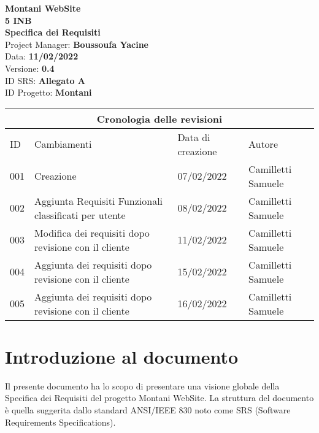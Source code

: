 \documentclass{article}
\begin{document}
	
	
	\begin{titlepage}
		\begin{center}
			\huge\textbf{Montani WebSite}\\
			\Large\textbf{5 INB}\\
			\Large \textbf{Specifica dei Requisiti}\\
			\vspace{4cm}
			\large Project Manager: \textbf{Boussoufa Yacine}\\
			\large Data: \textbf{11/02/2022}\\
			\large Versione: \textbf{0.4}\\
			\large ID SRS: \textbf{Allegato A}\\
			\large ID Progetto: \textbf{Montani}\\
			
		\end{center}
	\end{titlepage}
	
	\clearpage
	
	\begin{tabular}{ |p{1cm}|p{4cm}|p{3cm}|p{2cm}|  }
		\hline
		\multicolumn{4}{|c|}{Cronologia delle revisioni} \\
		\hline
		ID& Cambiamenti &Data di creazione&Autore\\
		\hline
		001   & Creazione    &07/02/2022&   Camilletti Samuele\\
		\hline
		002   & Aggiunta Requisiti Funzionali classificati per utente    &08/02/2022&   Camilletti Samuele\\
		\hline
		003   & Modifica dei requisiti dopo revisione con il cliente    &11/02/2022&   Camilletti Samuele\\
		\hline
		004   & Aggiunta dei requisiti dopo revisione con il cliente    &15/02/2022&   Camilletti Samuele\\
\hline
		005   & Aggiunta dei requisiti dopo revisione con il cliente    &16/02/2022&   Camilletti Samuele\\
\hline
	\end{tabular}
	
	\clearpage
	
	\tableofcontents
	\printindex	
	
   

	\section{\textbf{Introduzione al documento}}
	\flushleft
	\normalsize
	Il presente documento ha lo scopo di presentare una visione globale della Specifica dei Requisiti del progetto Montani WebSite. La struttura del documento è quella suggerita dallo standard ANSI/IEEE  830 noto come SRS (Software Requirements Specifications).
	\normalsize
\end{document}
